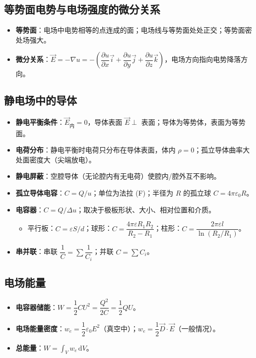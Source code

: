 \documentclass[12pt,a4paper]{ctexart}
\begin{document}
\subsection{等势面\quad 电势与电场强度的微分关系}

\begin{itemize}
    \item \textbf{等势面}：电场中电势相等的点连成的面；电场线与等势面处处正交；等势面密处场强大。
    \item \textbf{微分关系}：$\vec E=-\nabla u=-\left(\dfrac{\partial u}{\partial x}\vec i+\dfrac{\partial u}{\partial y}\vec j+\dfrac{\partial u}{\partial z}\vec k\right)$，电场方向指向电势降落方向。
\end{itemize}

\subsection{静电场中的导体}

\begin{itemize}
    \item \textbf{静电平衡条件}：$\vec E_{\text{内}}=0$，导体表面 $\vec E\perp$ 表面；导体为等势体，表面为等势面。
    \item \textbf{电荷分布}：静电平衡时电荷只分布在导体表面，体内 $\rho=0$；孤立导体曲率大处面密度大（尖端放电）。
    \item \textbf{静电屏蔽}：空腔导体（无论腔内有无电荷）使腔内/腔外互不影响。
    \item \textbf{孤立导体电容}：$C=Q/u$；单位为法拉 (F)；半径为 $R$ 的孤立球 $C=4\pi\varepsilon_0 R$。
    \item \textbf{电容器}：$C=Q/\Delta u$；取决于极板形状、大小、相对位置和介质。
    \begin{itemize}
        \item 平行板：$C=\varepsilon S/d$；球形：$C=\dfrac{4\pi\varepsilon R_1R_2}{R_2-R_1}$；柱形：$C=\dfrac{2\pi\varepsilon l}{\ln(R_2/R_1)}$。
    \end{itemize}
    \item \textbf{串并联}：串联 $\dfrac{1}{C}=\displaystyle\sum\dfrac{1}{C_i}$；并联 $C=\displaystyle\sum C_i$。
\end{itemize}

\subsection{电场能量}

\begin{itemize}
    \item \textbf{电容器储能}：$W=\dfrac{1}{2}CU^2=\dfrac{Q^2}{2C}=\dfrac{1}{2}QU$。
    \item \textbf{电场能量密度}：$w_e=\dfrac{1}{2}\varepsilon_0 E^2$（真空中）；$w_e=\dfrac{1}{2}\vec D\cdot\vec E$（一般情况）。
    \item \textbf{总能量}：$W=\displaystyle\int_V w_e\,\mathrm dV$。
\end{itemize}
\end{document}

